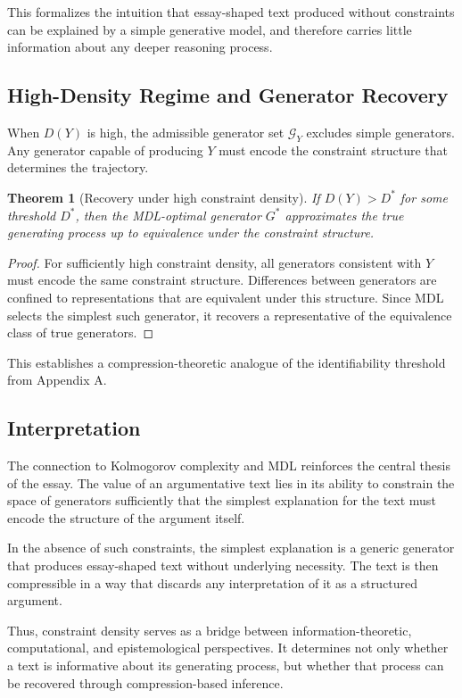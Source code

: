 \documentclass[12pt, oneside]{article}
\theoremstyle{plain}
\newtheorem{theorem}{Theorem}[section]
\theoremstyle{definition}
\theoremstyle{remark}
\begin{document}
This formalizes the intuition that essay-shaped text produced without constraints
can be explained by a simple generative model, and therefore carries little
information about any deeper reasoning process.

\subsection{High-Density Regime and Generator Recovery}

When $D(Y)$ is high, the admissible generator set $\mathcal{G}_Y$ excludes simple
generators. Any generator capable of producing $Y$ must encode the constraint
structure that determines the trajectory.

\begin{theorem}[Recovery under high constraint density]
If $D(Y) > D^*$ for some threshold $D^*$, then the MDL-optimal generator $G^*$
approximates the true generating process up to equivalence under the constraint
structure.
\end{theorem}

\begin{proof}
For sufficiently high constraint density, all generators consistent with $Y$ must
encode the same constraint structure. Differences between generators are confined
to representations that are equivalent under this structure. Since MDL selects the
simplest such generator, it recovers a representative of the equivalence class of
true generators.
\end{proof}

This establishes a compression-theoretic analogue of the identifiability threshold
from Appendix A.

\subsection{Interpretation}

The connection to Kolmogorov complexity and MDL reinforces the central thesis of
the essay. The value of an argumentative text lies in its ability to constrain the
space of generators sufficiently that the simplest explanation for the text must
encode the structure of the argument itself.

In the absence of such constraints, the simplest explanation is a generic
generator that produces essay-shaped text without underlying necessity. The text
is then compressible in a way that discards any interpretation of it as a
structured argument.

Thus, constraint density serves as a bridge between information-theoretic,
computational, and epistemological perspectives. It determines not only whether a
text is informative about its generating process, but whether that process can be
recovered through compression-based inference.
\end{document}
